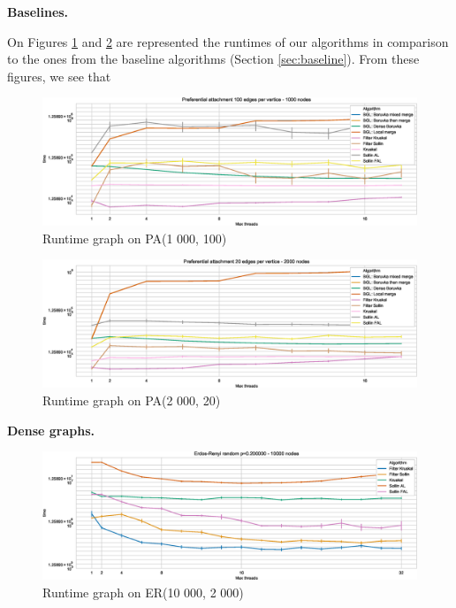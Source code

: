 \documentclass[letterpaper]{article}
\newcommand{\mypar}[1]{{\bf #1.}}
\begin{document}
\mypar{Baselines}

On Figures \ref{baseline1} and \ref{baseline2} are represented the runtimes of our algorithms in comparison to the ones from the baseline algorithms (Section \ref{sec:baseline}). From these figures, we see that 

\begin{figure}\centering
  \includegraphics[width=\linewidth]{graphics/Graph_runtime_Preferential_attachment_100_edges_per_vertice_1000.eps}
  \caption{Runtime graph on PA(1 000, 100)\label{baseline1}}
\end{figure}

\begin{figure}\centering
  \includegraphics[width=\linewidth]{graphics/Graph_runtime_Preferential_attachment_20_edges_per_vertice_2000.eps}
  \caption{Runtime graph on PA(2 000, 20)\label{baseline2}}
\end{figure}

\mypar{Dense graphs}

\begin{figure}\centering
  \includegraphics[width=\linewidth]{graphics/Graph_runtime_Erdos-Renyi_random_p=0.200000_10000.eps}
  \caption{Runtime graph on ER(10 000, 2 000)\label{denseERruntime}}
\end{figure}
\end{document}
